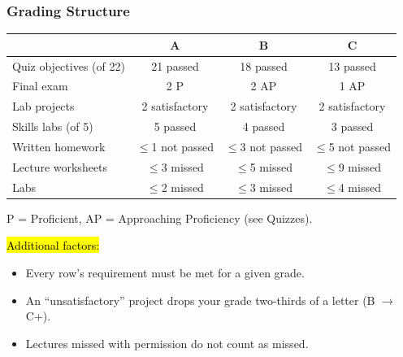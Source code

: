 \documentclass[slidestop,compress,mathserif]{beamer}
\begin{document}
\begin{frame}
	\frametitle{Grading Structure}
	\begin{table}[ht]
	\centering
	\scriptsize
	\renewcommand{\arraystretch}{1.05}
	\begin{tabular}{|l|c|c|c|}
	\hline
	 & \textbf{A} & \textbf{B} & \textbf{C} \\
	\hline
	Quiz objectives (of 22) & 21 passed & 18 passed & 13 passed \\
	\hline
	Final exam & 2 P & 2 AP & 1 AP \\
	\hline
	Lab projects & 2 satisfactory & 2 satisfactory & 2 satisfactory \\
	\hline
	Skills labs (of 5) & 5 passed & 4 passed & 3 passed \\
	\hline
	Written homework & $\le$1 not passed & $\le$3 not passed & $\le$5 not passed \\
	\hline
	Lecture worksheets & $\le$3 missed & $\le$5 missed & $\le$9 missed \\
	\hline
	Labs & $\le$2 missed & $\le$3 missed & $\le$4 missed \\
	\hline
	\end{tabular}
	\end{table}
	\vspace{-0.4em}
	{\scriptsize \hspace{3em} P = Proficient, AP = Approaching Proficiency (see Quizzes).}

	\hl{Additional factors:}
	\begin{itemize}\itemsep=1pt
		\item Every row's requirement must be met for a given grade.
		\item An ``unsatisfactory'' project drops your grade two-thirds of a letter (B $\to$ C+).
		\item Lectures missed with permission do not count as missed.
	\end{itemize}
\end{frame}




\end{document}
